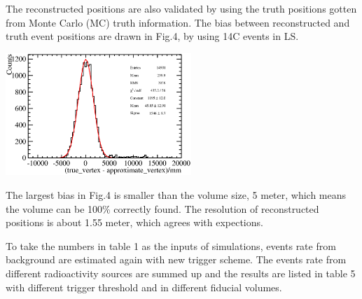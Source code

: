 \documentclass[a4paper,10pt,twoside]{paper}
\begin{document}
\begin{multicols}{2}
		The reconstructed positions are also validated by using the truth positions gotten from Monte Carlo (MC) truth information. 
		The bias between reconstructed and truth event positions are drawn in Fig.4, by using 14C events in LS. 

		\begin{center}
			\includegraphics[width=7cm]{C14_deltaR_new.eps}
		\end{center}

		The largest bias in Fig.4 is smaller than the volume size, 5 meter, which means the volume can be 100\% correctly found.
		The resolution of reconstructed positions is about 1.55 meter, which agrees with expections.


		To take the numbers in table 1 as the inputs of simulations, events rate from background are estimated again with new trigger scheme. 
		The events rate from different radioactivity sources are summed up and the results are listed in table 5 with different trigger threshold and in
		different fiducial volumes.


	\end{multicols}
\end{document}
